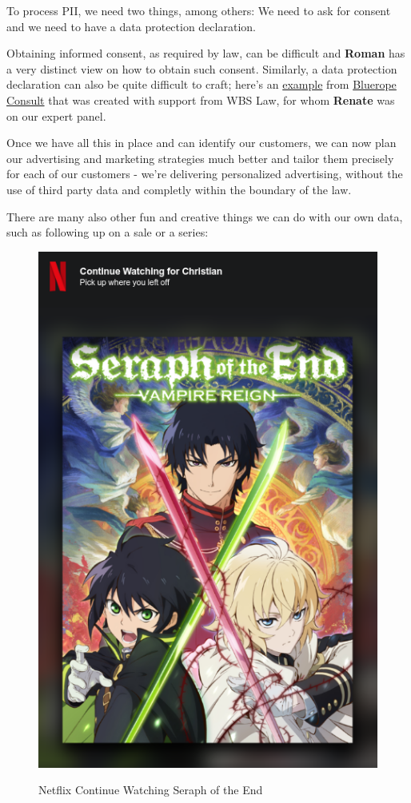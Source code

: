 To process PII, we need two things, among others: We need to ask for consent and we need to have a data protection declaration.

Obtaining informed consent, as required by law, can be difficult and \textbf{Roman} has a very distinct view on how to obtain such consent. Similarly, a data protection declaration can also be quite difficult to craft; here's an \href{https://blueropeconsultonline.de/datenschutz/}{example} from \href{https://blueropeconsultonline.de/}{Bluerope Consult} that was created with support from WBS Law, for whom \textbf{Renate} was on our expert panel.

Once we have all this in place and can identify our customers, we can now plan our advertising and marketing strategies much better and tailor them precisely for each of our customers - we're delivering personalized advertising, without the use of third party data and completly within the boundary of the law.

There are many also other fun and creative things we can do with our own data, such as following up on a sale or a series:

\begin{figure}[H]
\centering
\caption {Netflix Continue Watching Seraph of the End}
\includegraphics[scale=0.6]{images/continue-seraph.png}
\label{fig:seraph}
\end{figure}

